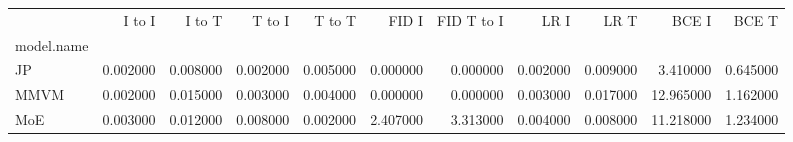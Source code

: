 \begin{tabular}{lrrrrrrrrrr}
\toprule
 & I to I & I to T & T to I & T to T & FID I & FID T to I & LR I & LR T & BCE I & BCE T \\
model.name &  &  &  &  &  &  &  &  &  &  \\
\midrule
JP & 0.002000 & 0.008000 & 0.002000 & 0.005000 & 0.000000 & 0.000000 & 0.002000 & 0.009000 & 3.410000 & 0.645000 \\
MMVM & 0.002000 & 0.015000 & 0.003000 & 0.004000 & 0.000000 & 0.000000 & 0.003000 & 0.017000 & 12.965000 & 1.162000 \\
MoE & 0.003000 & 0.012000 & 0.008000 & 0.002000 & 2.407000 & 3.313000 & 0.004000 & 0.008000 & 11.218000 & 1.234000 \\
\bottomrule
\end{tabular}
